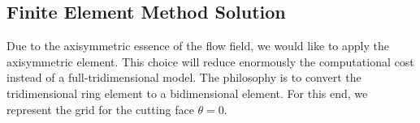 \documentclass[12pt]{book}
\theoremstyle{bfnote}
\theoremstyle{bfnote}
\begin{document}
\subsection{Finite Element Method Solution} %
\label{subsec:Finite_Element_Method_Solution}
Due to the axisymmetric essence of the flow field, we would like to apply the axisymmetric element. This choice will reduce enormously the computational cost instead of a full-tridimensional model. The philosophy is to convert the tridimensional ring element to a bidimensional element. For this end, we represent the grid for the cutting face $\theta = 0$.

\begin{figure}
    
\end{figure}






















\end{document}
